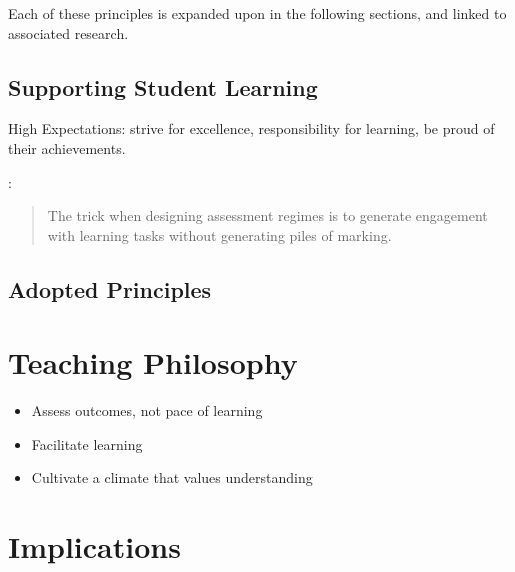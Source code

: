 Each of these principles is expanded upon in the following sections, and linked to associated research.






\subsection{Supporting Student Learning} %
\label{sub:supporting_student_learning}

High Expectations: strive for excellence, responsibility for learning, be proud of their achievements.

\citet{Chickering:1987}:

\citet{Gibbs:2004} 

\begin{quote}
	The trick when designing assessment regimes is to generate engagement with learning tasks without generating piles of marking.
\end{quote}



\subsection{Adopted Principles} %
\label{sub:adopted_principles}






\section{Teaching Philosophy} %
\label{sec:teaching_philosophy}

\begin{itemize}
	\item Assess outcomes, not pace of learning
	\item Facilitate learning 
	\item Cultivate a climate that values understanding
\end{itemize}




\section{Implications} %
\label{sec:implications}

